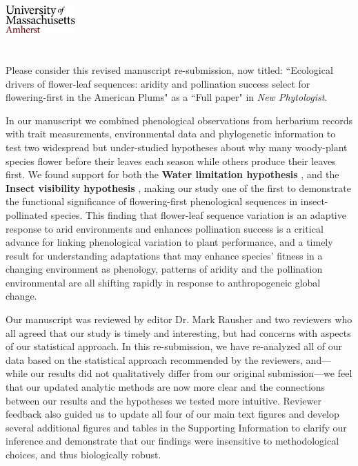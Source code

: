 \documentclass{article}[12pt]
\begin{document}

\noindent\includegraphics[width=0.2\textwidth]{umasslogo}\\\\

\\

\noindent Please consider this revised manuscript re-submission, now titled: ``Ecological drivers of flower-leaf sequences: aridity and pollination success select for flowering-first in the American Plums" as a ``Full paper" in \textit{New Phytologist}.

In our manuscript we combined phenological observations from herbarium records with trait measurements, environmental data and phylogenetic information to test two widespread but under-studied hypotheses about why many woody-plant species flower before their leaves each season while others produce their leaves first. We found support for both the \textbf{Water limitation hypothesis} \citep{Gougherty2018,Buonaiuto2020}, and the \textbf{Insect visibility hypothesis} \citep{Janzen1967}, making our study one of the first to demonstrate the functional significance of flowering-first phenological sequences in insect-pollinated species. This finding that flower-leaf sequence variation is an adaptive response to arid environments and enhances pollination success is a critical advance for linking phenological variation to plant performance, and a timely result for understanding adaptations that may enhance species' fitness in a changing environment as phenology, patterns of aridity and the pollination environmental are all shifting rapidly in response to anthropogeneic global change.

Our manuscript was reviewed by editor Dr. Mark Rausher and two reviewers who all agreed that our study is timely and interesting, but had concerns with aspects of our statistical approach. In this re-submission, we have re-analyzed all of our data based on the statistical approach recommended by the reviewers, and---while our results did not qualitatively differ from our original submission---we feel that our updated analytic methods are now more clear and the connections between our results and the hypotheses we tested more intuitive. Reviewer feedback also guided us to update all four of our main text figures and develop several additional figures and tables in the Supporting Information to clarify our inference and demonstrate that our findings were insensitive to methodological choices, and thus biologically robust.
\end{document}
